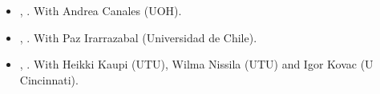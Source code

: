 \begin{itemize}


  	\item[\textcolor{gray}{\textbullet}] \href{https://raw.githubusercontent.com/hbahamonde/Economic_Experiment_Vote_Selling/master/abstract.txt}{\unskip}, {\bf \emph{\unskip}}. With Andrea Canales (UOH).


	\item[\textcolor{gray}{\textbullet}] \href{https://raw.githubusercontent.com/hbahamonde/Tobalaba/master/abstract.txt}{\unskip}, {\bf \emph{\unskip}}. With Paz Irarrazabal (Universidad de Chile).



	\item[\textcolor{gray}{\textbullet}] \href{https://github.com/hbahamonde/Bahamonde_Kovac/raw/master/Bahamonde_Kovac.pdf}{\unskip}, {\bf \emph{\unskip}}. With Heikki Kaupi (UTU), Wilma Nissila (UTU) and Igor Kovac (U Cincinnati).



\end{itemize}

